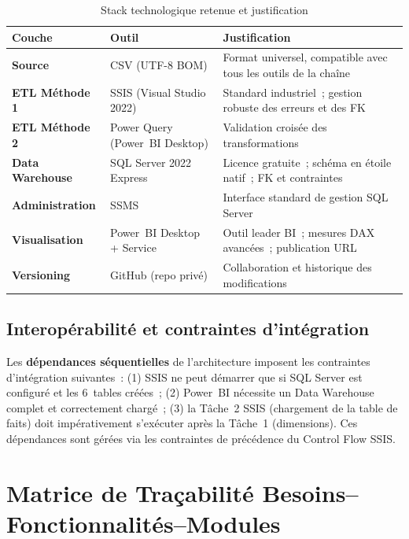 \documentclass[12pt, a4paper]{report}
\begin{document}
\begin{table}[H]
\centering
\caption{Stack technologique retenue et justification}
\label{tab:stack}
\renewcommand{\arraystretch}{1.3}
\begin{tabularx}{\textwidth}{>{\bfseries}p{4cm} p{4.9cm} X}
\toprule
\rowcolor{primary!12}
Couche & Outil & Justification \\
\midrule
Source & CSV (UTF-8 BOM) & Format universel, compatible avec tous les outils de la chaîne \\
ETL Méthode 1 & SSIS (Visual Studio 2022) & Standard industriel~; gestion robuste des erreurs et des FK \\
ETL Méthode 2 & Power Query (Power~BI Desktop) & Validation croisée des transformations \\
Data Warehouse & SQL Server 2022 Express & Licence gratuite~; schéma en étoile natif~; FK et contraintes \\
Administration & SSMS & Interface standard de gestion SQL Server \\
Visualisation & Power~BI Desktop + Service & Outil leader BI~; mesures DAX avancées~; publication URL \\
Versioning & GitHub (repo privé) & Collaboration et historique des modifications \\
\bottomrule
\end{tabularx}
\end{table}

\subsection{Interopérabilité et contraintes d'intégration}

Les \textbf{dépendances séquentielles} de l'architecture imposent les contraintes
d'intégration suivantes~: (1) SSIS ne peut démarrer que si SQL Server est configuré
et les 6~tables créées~; (2) Power~BI nécessite un Data Warehouse complet et
correctement chargé~; (3) la Tâche~2 SSIS (chargement de la table de faits) doit
impérativement s'exécuter après la Tâche~1 (dimensions). Ces dépendances sont
gérées via les contraintes de précédence du Control Flow SSIS.

\section{Matrice de Traçabilité Besoins--Fonctionnalités--Modules}
\end{document}
